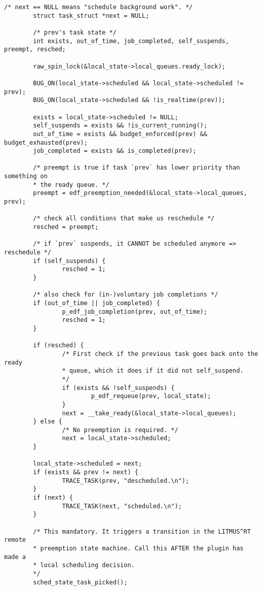 \begin{lstlisting}[style=cstyle, caption=linux/litmus/sched\_p\_edf.c, label=annexe:p-edf]
        /* next == NULL means "schedule background work". */
        struct task_struct *next = NULL;

        /* prev's task state */
        int exists, out_of_time, job_completed, self_suspends, preempt, resched;

        raw_spin_lock(&local_state->local_queues.ready_lock);

        BUG_ON(local_state->scheduled && local_state->scheduled != prev);
        BUG_ON(local_state->scheduled && !is_realtime(prev));

        exists = local_state->scheduled != NULL;
        self_suspends = exists && !is_current_running();
        out_of_time = exists && budget_enforced(prev) && budget_exhausted(prev);
        job_completed = exists && is_completed(prev);

        /* preempt is true if task `prev` has lower priority than something on
        * the ready queue. */
        preempt = edf_preemption_needed(&local_state->local_queues, prev);

        /* check all conditions that make us reschedule */
        resched = preempt;

        /* if `prev` suspends, it CANNOT be scheduled anymore => reschedule */
        if (self_suspends) {
                resched = 1;
        }

        /* also check for (in-)voluntary job completions */
        if (out_of_time || job_completed) {
                p_edf_job_completion(prev, out_of_time);
                resched = 1;
        }

        if (resched) {
                /* First check if the previous task goes back onto the ready
                * queue, which it does if it did not self_suspend.
                */
                if (exists && !self_suspends) {
                        p_edf_requeue(prev, local_state);
                }
                next = __take_ready(&local_state->local_queues);
        } else {
                /* No preemption is required. */
                next = local_state->scheduled;
        }

        local_state->scheduled = next;
        if (exists && prev != next) {
                TRACE_TASK(prev, "descheduled.\n");
        }
        if (next) {
                TRACE_TASK(next, "scheduled.\n");
        }

        /* This mandatory. It triggers a transition in the LITMUS^RT remote
        * preemption state machine. Call this AFTER the plugin has made a
        * local scheduling decision.
        */
        sched_state_task_picked();


\end{lstlisting}
